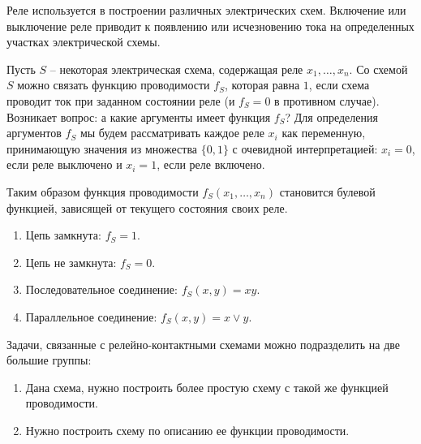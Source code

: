 \begin{note}
    Реле используется в построении различных электрических схем. Включение или выключение реле приводит к появлению или исчезновению тока на определенных участках электрической схемы.

    Пусть $S$ -- некоторая электрическая схема, содержащая реле $x_1,\ldots,x_n$. Со схемой $S$ можно связать функцию проводимости $f_S$, которая равна $1$, если схема проводит ток при заданном состоянии реле (и $f_S = 0$ в противном случае). Возникает вопрос: а какие аргументы имеет функция $f_S$? Для определения аргументов $f_S$ мы будем рассматривать каждое реле $x_i$ как переменную, принимающую значения из множества $\{0,1\}$ с очевидной интерпретацией: $x_i = 0$, если реле выключено и $x_i = 1$, если реле включено.

    Таким образом функция проводимости $f_S(x_1,\ldots,x_n)$ становится булевой функцией, зависящей от текущего состояния своих реле.
    \begin{enumerate}
        \item Цепь замкнута: $f_S = 1$.
        \item Цепь не замкнута: $f_S = 0$.
        \item Последовательное соединение: $f_S(x,y) = xy$.
        \item Параллельное соединение: $f_S(x,y) = x \lor y$.
    \end{enumerate}

    Задачи, связанные с релейно-контактными схемами можно подразделить на две большие группы:
    \begin{enumerate}
        \item Дана схема, нужно построить более простую схему с такой же функцией проводимости.
        \item Нужно построить схему по описанию ее функции проводимости.
    \end{enumerate}
\end{note}

\newpage